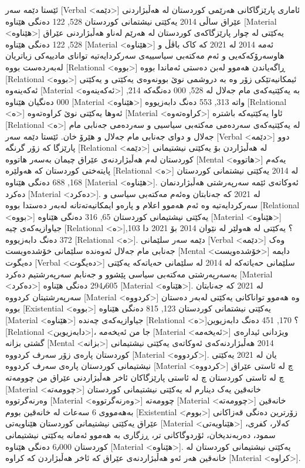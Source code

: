 ئێستا دێمە سەر [Verbal <دێمە>] ئاماری پارێزگاکانی هەرێمی کوردستان لە هەڵبژاردنی عێراق ساڵی 2014 یەکێتی نیشتمانی کوردستان 528, 122 دەنگی هێناوە [Material <هێناوە>] یەکێتی لە چوار پارێزگاکەی کوردستان لە هەرێم لەناو هەڵبژاردنی عێراق 528, 122 دەنگی هێناوە [Material <هێناوە>] ئەمە 2014 لە 2021 کە کاک باڤڵ و هاوسەرۆکەکەیی و ئەم مەکتەبی سیاسییەی سەرکردایەتیە توانای مادییەکی زیاتریان لەبەردەست بووە [Relational <بووە>] ڕاگەیاندن هەموو لەبن دەستی ئەماندا بووە [Relational <بووە>] ئیمکانیەتێکی زۆر وە بە دروشمی نوێ بوونەوەی یەکێتی و یەکێتی ئەکەینەوە [Material <ئەکەینەوە>] بە یەکێتیەکەی مام جەلال لە 528, 000 دەنگەکە 214, 000 دەنگیان هێناوە [Material <هێناوە>] واتە 313, 553 دەنگ دابەزیووە [Relational <ە>] ئەوها یەکێتی نوێ کراوەتەوە [Material <کراوەتەوە>] ئاوا یەکێتیەکە باشترە [Relational <ە>] لە یەکێتیەکەی سەردەمی مەکتەبی سیاسیی و سەردەمی جەنابی مام جەلال و دوای جەنابی مام جەلال و هێرۆ خان. ئێستا دێمە سەر [Verbal <دێمە>] دوو پارێزگا کە زۆر گرنگە [Relational <دێمە>] لە هەڵبژاردن بۆ یەکێتی نیشتیمانی کوردستان لەم هەڵبژاردنەی عێراق چیمان بەسەر هاتووە [Mental <هاتووە>] یەکەم پایتەختی کوردستان کە هەولێرە [Relational <ە>] لە 2014 یەکێتی نیشتمانی کوردستان 168, 688 دەنگی هێناوە [Material <هێناوە>].
ئەوکاتەی ئێمە سەرپەرشتی هەڵبژاردنمان دەکرد [Material <دەکرد>]. لە 2021 کە جەنابتان وەئەم مەکتەبی سیاسی و سەرکردایەتیە وە ئەم هەموو اعلام و پارەو ایمکانیەتەتانە لەبەر دەستدا بووە [Relational <بووە>] یەکێتی نیشتیمانی کوردستان 65, 316 دەنگی هێناوە [Material <هێناوە>] جیاوازیەکەی چیە [Relational <ە>]؟ یەکێتی لە هەولێر لە نێوان 2014 بۆ 2021 دا 103, 372 دەنگ دابەزیووە [Relational <ە>].
دێمە سەر سلێمانی [Verbal <دێمە>] وەک جەنابی مام جەلال ئەوەندە سلێمانی خۆشدەویست [Mental <خۆشدەویست>] دایمە دەیگوت [Verbal <دەیگوت>] سلێمانی حەیاتەکە لە 2014 لە سلێمانی حەیاتەکە یەکێتی بەسەرپەرشتی مەکتەبی سیاسی پێشوو و جەنابم سەرپەرشتیم دەکرد [Material <دەکرد>] 294٫605 دەنگی هێناوە [Material <هێناوە>]. لە 2021 کە جەنابتان سەرپەرشتیتان کردووە [Material <کردووە>] وە هەموو تواناکانی یەکێتی لەبەر دەستان بووە [Existential <بووە>] یەکێتی نیشتمانی کوردستان 123, 815 دەنگی هێناوە [Material <هێناوە>] جیاوازیەکەی چەندە [Relational <ە>]؟ 170, 451 دەنگ دابەزیوین [Relational <دابەزیوین>]، جا من ئەیخەمه [Material <ئەیخەمه>] ویژدانی ئیدارەی گشتی بزانە [Mental <بزانە>] 2014 هەڵبژاردنەکەی ئەوکاتەی یەکێتی نیشتیمانی کوردستان پارەی زۆر سەرف کردووە [Material <کردووە>].
یان لە 2021 یەکێتی نیشتیمانی کوردستان پارەی سەرف کردووە [Material <کردووە>] چ لە ئاستی عێراق چ لە ئاستی کوردستان چ له ئاستی پارێزگاکان ئاخر هەڵبژاردنی عێراق من چوومەتە [Material <چوومەتە>] خانەقین یەک دینارم لە یەکێتی نیشتیمانی کوردستان وەرنەگرتووە [Material <وەرنەگرتووە>] چوومەتە [Material <چوومەتە>] خانەقین بەهەمووی 6 سەعات لە خانەقین بووم [Existential <بووم>] زۆرترین دەنگی قەزاکانی عێراق یەکێتی نیشتیمانی کوردستان هێناویەتی [Material <هێناویەتی>] کەلار، کفری، سمود، دەربەندیخان، ئۆردوگاکانی تر، ڕزگاری بە هەموو ئەمانە یەکێتی نیشتیمانی کوردستان 6٫000 دەنگی هێناوە [Material <هێناوە>]. یەکێتی نیشتیمانی کوردستان لە خانەقین هەر ئەو هەڵبژاردنەی عێراق کە ئاخر هەڵبژاردن که کراوە [Material <کراوە>].
